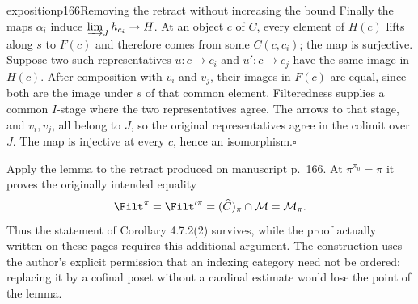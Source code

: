 \begin{dcomment}{exposition}{p166}{Removing the retract without increasing the bound}
Finally the maps $\alpha_i$ induce $\varinjlim_Jh_{c_i}\to H$. At an object $c$ of $C$, every element of $H(c)$ lifts along $s$ to $F(c)$ and therefore comes from some $C(c,c_i)$; the map is surjective. Suppose two such representatives $u:c\to c_i$ and $u':c\to c_j$ have the same image in $H(c)$. After composition with $v_i$ and $v_j$, their images in $F(c)$ are equal, since both are the image under $s$ of that common element. Filteredness supplies a common $I$-stage where the two representatives agree. The arrows to that stage, and $v_i,v_j$, all belong to $J$, so the original representatives agree in the colimit over $J$. The map is injective at every $c$, hence an isomorphism.\hfill$\square$

Apply the lemma to the retract produced on manuscript p.~166. At $\pi^{\pi_0}=\pi$ it proves the originally intended equality
\[
 \Filt^\pi=\Filt'^\pi=(\widehat C)_\pi\cap\mathcal M
 =\mathcal M_\pi.
\]
Thus the statement of Corollary 4.7.2(2) survives, while the proof actually written on these pages requires this additional argument. The construction uses the author's explicit permission that an indexing category need not be ordered; replacing it by a cofinal poset without a cardinal estimate would lose the point of the lemma.
\end{dcomment}


